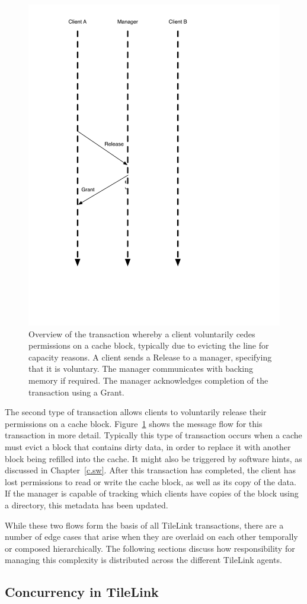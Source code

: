 \begin{figure}[t!]
\centering
\includegraphics[width=0.5\columnwidth]{tilelink/figures/volwb.pdf}
\caption{Overview of the transaction whereby a client voluntarily cedes permissions on a cache block,
typically due to evicting the line for capacity reasons.
A client sends a Release to a manager, specifying that it is voluntary.
The manager communicates with backing memory if required.
The manager acknowledges completion of the transaction using a Grant.
}
\label{fig:volwb}
\end{figure}

The second type of transaction allows clients to voluntarily release their permissions on a cache block.
Figure~\ref{fig:volwb} shows the message flow for this transaction in more detail.
Typically this type of transaction occurs when a cache must evict a block that contains dirty data, in order to replace it
with another block being refilled into the cache.
It might also be triggered by software hints, as discussed in Chapter~\ref{c.sw}.
After this transaction has completed, the client has lost permissions to read or write the cache block, as well as its copy of the data.
If the manager is capable of tracking which clients have copies of the block using a directory, this metadata has been updated.

While these two flows form the basis of all TileLink transactions, there are a number of edge cases that arise when
they are overlaid on each other temporally or composed hierarchically.
The following sections discuss how responsibility for managing this complexity is distributed across the different TileLink agents.

\subsection{Concurrency in TileLink}

